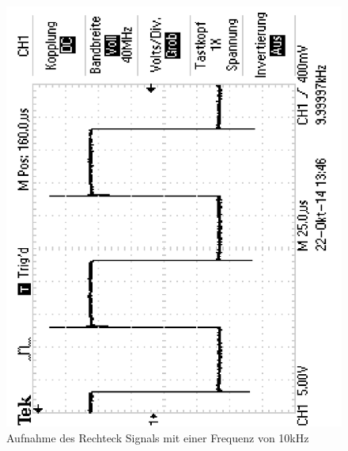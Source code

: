 \documentclass[12pt,a4paper]{article}
\begin{document}
\begin{figure}[H] 
  \centering
    \includegraphics[scale = 0.4, angle = -90]{2_1_rech_10khz.pdf}
  	\caption[Aufnahme des Rechtecksignals mit einer Frequenz von 10kHz]{Aufnahme des Rechteck Signals mit einer Frequenz von 10kHz}
  \label{fig:2_1_rech_10khz}
\end{figure}
\end{document}
